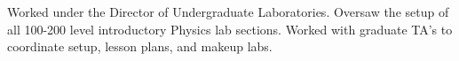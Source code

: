 \documentclass[letterpaper]{deedy-resume} %
\begin{document}
\sectionspace %



Worked under the Director of Undergraduate Laboratories. Oversaw the setup of all 100-200 level introductory Physics lab sections. Worked with graduate TA’s to coordinate setup, lesson plans, and makeup labs.

\sectionspace %






%
%










\end{document}
